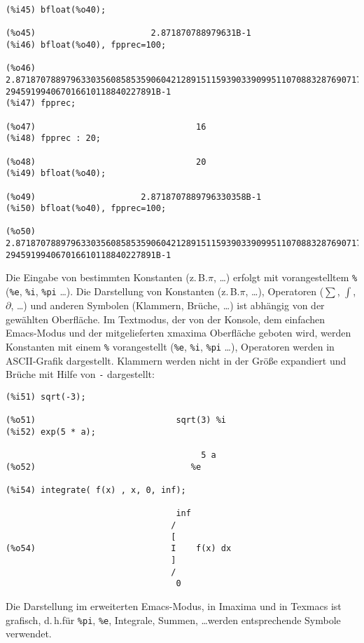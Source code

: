 \documentclass[12pt]{scrartcl}
\newcommand*\zB{z.\,B.\xspace}
\begin{document}
\begin{verbatim}
(%i45) bfloat(%o40);

(%o45)                       2.871870788979631B-1
(%i46) bfloat(%o40), fpprec=100;

(%o46) 2.871870788979633035608585359060421289151159390339099511070883287690717#
294591994067016610118840227891B-1
(%i47) fpprec;

(%o47)                                16
(%i48) fpprec : 20;

(%o48)                                20
(%i49) bfloat(%o40);

(%o49)                     2.8718707889796330358B-1
(%i50) bfloat(%o40), fpprec=100;

(%o50) 2.871870788979633035608585359060421289151159390339099511070883287690717#
294591994067016610118840227891B-1
\end{verbatim}

Die Eingabe von bestimmten Konstanten (\zB $\pi$, \ldots) erfolgt mit
vorangestelltem \texttt{\%} (\texttt{\%e}, \texttt{\%i}, \texttt{\%pi} \ldots).
Die Darstellung von Konstanten (\zB $\pi$, \ldots), Operatoren
($\sum$, $\int$, $\partial$, \ldots) und anderen Symbolen (Klammern,
Brüche, \ldots) ist abhängig von der gewählten Oberfläche. Im
Textmodus, der von der Konsole, dem einfachen Emacs-Modus und der
mitgelieferten xmaxima Oberfläche geboten wird, werden Konstanten mit
einem \texttt{\%} vorangestellt (\texttt{\%e}, \texttt{\%i},
\texttt{\%pi} \ldots), Operatoren werden in ASCII-Grafik dargestellt.
Klammern werden nicht in der Größe expandiert und Brüche mit Hilfe von
\texttt{-} dargestellt:

\begin{verbatim}
(%i51) sqrt(-3);

(%o51)                            sqrt(3) %i
(%i52) exp(5 * a);

                                       5 a
(%o52)                               %e

(%i54) integrate( f(x) , x, 0, inf);

                                  inf
                                 /
                                 [
(%o54)                           I    f(x) dx
                                 ]
                                 /
                                  0
\end{verbatim}

Die Darstellung im erweiterten Emacs-Modus, in Imaxima und in Texmacs
ist grafisch, d.\,h.\@ für \texttt{\%pi}, \texttt{\%e}, Integrale,
Summen, \ldots werden entsprechende Symbole verwendet.
\end{document}
